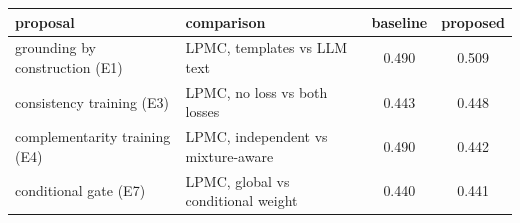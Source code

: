 \begin{tabular}{llcc}
\toprule
proposal & comparison & baseline & proposed \\
\midrule
grounding by construction (E1) & LPMC, templates vs LLM text & 0.490 & 0.509 \\
consistency training (E3) & LPMC, no loss vs both losses & 0.443 & 0.448 \\
complementarity training (E4) & LPMC, independent vs mixture-aware & 0.490 & 0.442 \\
conditional gate (E7) & LPMC, global vs conditional weight & 0.440 & 0.441 \\
\bottomrule
\end{tabular}